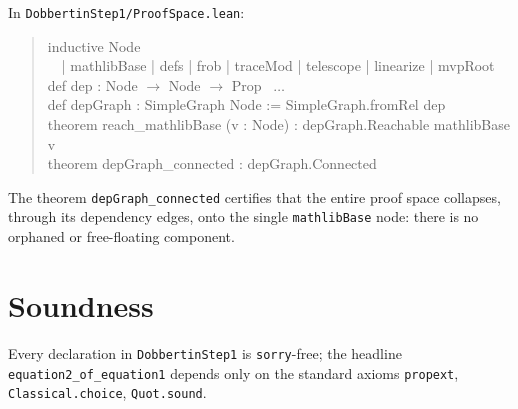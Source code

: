 \documentclass[11pt]{article}
\newcommand{\lc}[1]{\texttt{#1}}
\begin{document}
\noindent In \lc{DobbertinStep1/ProofSpace.lean}:
\begin{quote}\small\ttfamily
inductive Node\\
\ \ | mathlibBase | defs | frob | traceMod | telescope | linearize | mvpRoot\\[4pt]
def dep : Node $\to$ Node $\to$ Prop \ $\ldots$\\
def depGraph : SimpleGraph Node := SimpleGraph.fromRel dep\\[4pt]
theorem reach\_mathlibBase (v : Node) : depGraph.Reachable mathlibBase v\\
theorem depGraph\_connected : depGraph.Connected
\end{quote}
The theorem \lc{depGraph\_connected} certifies that the entire proof space
collapses, through its dependency edges, onto the single \lc{mathlibBase} node:
there is no orphaned or free-floating component.

\section*{Soundness}
Every declaration in \lc{DobbertinStep1} is \lc{sorry}-free; the headline
\lc{equation2\_of\_equation1} depends only on the standard axioms
\lc{propext}, \lc{Classical.choice}, \lc{Quot.sound}.
\end{document}
